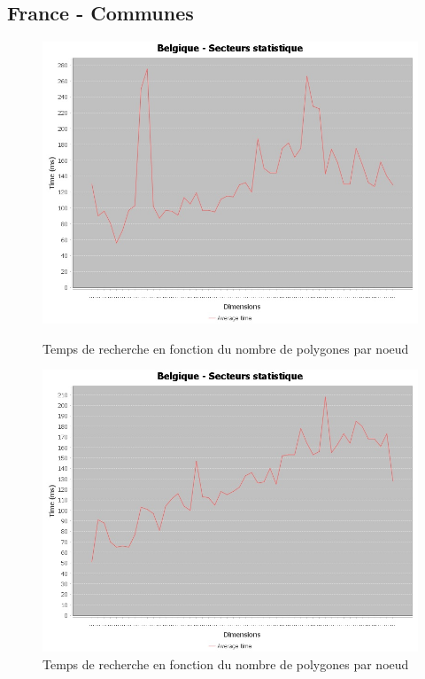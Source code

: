 \documentclass {article}
\begin{document}

\newpage
\subsection {France - Communes}\label{france}

\begin{figure}[h]
    \begin{minipage}[t]{0.46\textwidth}
	\centering
	\includegraphics[width=\textwidth]{graph_lineaire_Belgique.png}
	\caption{Temps de recherche en fonction du nombre de polygones par noeud}
	\label{fig:belgique_stat_find_lin}
    \end{minipage}
    \begin{minipage}[t]{0.46\textwidth}
	\centering
	\includegraphics[width=\textwidth]{graph_quadratique_Belgique.png}
	\caption{Temps de recherche en fonction du nombre de polygones par noeud}
	\label{fig:belgique_stat_find_quad}
    \end{minipage}
\end{figure}
\end{document}
